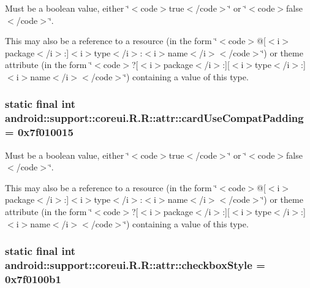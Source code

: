 Must be a boolean value, either \char`\"{}$<$code$>$true$<$/code$>$\char`\"{} or \char`\"{}$<$code$>$false$<$/code$>$\char`\"{}. 

This may also be a reference to a resource (in the form \char`\"{}$<$code$>$@\mbox{[}$<$i$>$package$<$/i$>$:\mbox{]}$<$i$>$type$<$/i$>$:$<$i$>$name$<$/i$>$$<$/code$>$\char`\"{}) or theme attribute (in the form \char`\"{}$<$code$>$?\mbox{[}$<$i$>$package$<$/i$>$:\mbox{]}\mbox{[}$<$i$>$type$<$/i$>$:\mbox{]}$<$i$>$name$<$/i$>$$<$/code$>$\char`\"{}) containing a value of this type. \hypertarget{classandroid_1_1support_1_1coreui_1_1_r_1_1attr_8db337d378af2781621382bb489248b0}{
\subsubsection[{cardUseCompatPadding}]{\setlength{\rightskip}{0pt plus 5cm}static final int android::support::coreui.R.R::attr::cardUseCompatPadding = 0x7f010015}}
\label{classandroid_1_1support_1_1coreui_1_1_r_1_1attr_8db337d378af2781621382bb489248b0}


Must be a boolean value, either \char`\"{}$<$code$>$true$<$/code$>$\char`\"{} or \char`\"{}$<$code$>$false$<$/code$>$\char`\"{}. 

This may also be a reference to a resource (in the form \char`\"{}$<$code$>$@\mbox{[}$<$i$>$package$<$/i$>$:\mbox{]}$<$i$>$type$<$/i$>$:$<$i$>$name$<$/i$>$$<$/code$>$\char`\"{}) or theme attribute (in the form \char`\"{}$<$code$>$?\mbox{[}$<$i$>$package$<$/i$>$:\mbox{]}\mbox{[}$<$i$>$type$<$/i$>$:\mbox{]}$<$i$>$name$<$/i$>$$<$/code$>$\char`\"{}) containing a value of this type. \hypertarget{classandroid_1_1support_1_1coreui_1_1_r_1_1attr_374c53dbfaff4bdb4f9ec6de79dfcd39}{
\subsubsection[{checkboxStyle}]{\setlength{\rightskip}{0pt plus 5cm}static final int android::support::coreui.R.R::attr::checkboxStyle = 0x7f0100b1}}
\label{classandroid_1_1support_1_1coreui_1_1_r_1_1attr_374c53dbfaff4bdb4f9ec6de79dfcd39}


